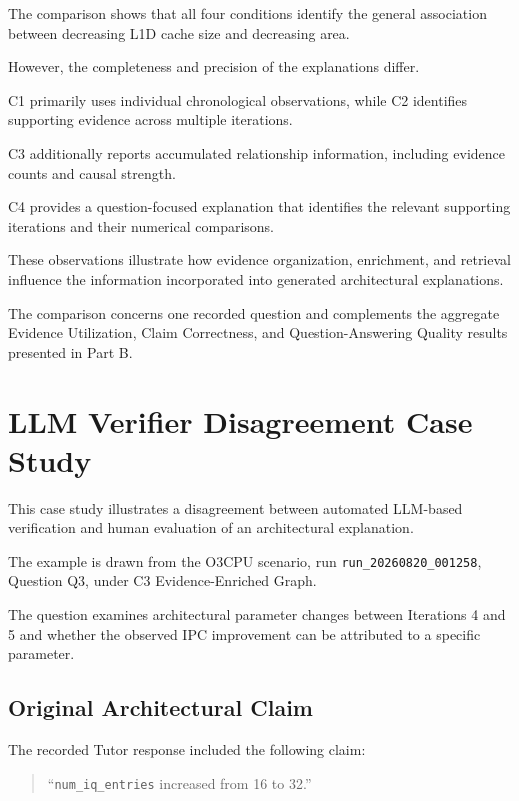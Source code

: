 The comparison shows that all four
conditions identify the general
association between decreasing
L1D cache size and decreasing area.

However, the completeness and
precision of the explanations differ.

C1 primarily uses individual
chronological observations,
while C2 identifies supporting
evidence across multiple iterations.

C3 additionally reports
accumulated relationship
information, including evidence
counts and causal strength.

C4 provides a question-focused
explanation that identifies the
relevant supporting iterations
and their numerical comparisons.

These observations illustrate
how evidence organization,
enrichment, and retrieval
influence the information
incorporated into generated
architectural explanations.

The comparison concerns one
recorded question and complements
the aggregate Evidence Utilization,
Claim Correctness, and
Question-Answering Quality
results presented in Part B.



\section{LLM Verifier Disagreement Case Study}
\label{app:part_b_verifier_disagreements}

This case study illustrates a
disagreement between automated
LLM-based verification and
human evaluation of an
architectural explanation.

The example is drawn from
the O3CPU scenario,
run \texttt{run\_20260820\_001258},
Question Q3, under C3
Evidence-Enriched Graph.

The question examines architectural
parameter changes between
Iterations 4 and 5 and whether
the observed IPC improvement
can be attributed to a
specific parameter.

\subsection{Original Architectural Claim}

The recorded Tutor response
included the following claim:

\begin{quote}
``\texttt{num\_iq\_entries}
increased from 16 to 32.''
\end{quote}

